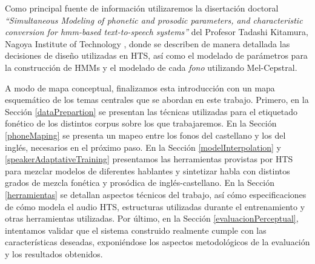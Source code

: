 Como principal fuente de información utilizaremos la disertación doctoral \textit{``Simultaneous Modeling of phonetic and prosodic parameters, and characteristic conversion for hmm-based text-to-speech systems''} del Profesor Tadashi Kitamura, Nagoya Institute of Technology \cite{phoneticAndProsodic}, donde se describen de manera detallada las decisiones de diseño utilizadas en HTS, así como el modelado de parámetros para la construcción de HMMs y el modelado de cada \textit{fono} utilizando Mel-Cepstral.

A modo de mapa conceptual, finalizamos esta introducción con un mapa esquemático de los temas centrales que se abordan en este trabajo. Primero, en la Sección \ref{dataPrepartion} se presentan las técnicas utilizadas para el etiquetado fonético de los distintos corpus sobre los que trabajaremos. En la Sección \ref{phoneMaping} se presenta un mapeo entre los fonos del castellano y los del inglés, necesarios en el próximo paso. En la Sección \ref{modelInterpolation} y \ref{speakerAdaptativeTraining} presentamos las herramientas provistas por HTS para mezclar modelos de diferentes hablantes y sintetizar habla con distintos grados de mezcla fonética y prosódica de inglés-castellano. En la Sección \ref{herramientas} se detallan aspectos técnicos del trabajo, así cómo especificaciones de cómo modela el audio HTS, estructuras utilizadas durante el entrenamiento y otras herramientas utilizadas. Por último, en la Sección \ref{evaluacionPerceptual}, intentamos validar que el sistema construido realmente cumple con las características deseadas, exponiéndose los aspectos metodológicos de la evaluación y los resultados obtenidos.
